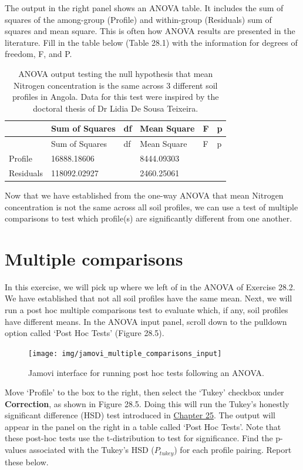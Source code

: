 \documentclass[
]{scrbook}
\begin{document}
The output in the right panel shows an ANOVA table.
It includes the sum of squares of the among-group (Profile) and within-group (Residuals) sum of squares and mean square.
This is often how ANOVA results are presented in the literature.
Fill in the table below (Table 28.1) with the information for degrees of freedom, F, and P.

\begin{longtable}[]{@{}llllll@{}}
\caption{\label{tab:unnamed-chunk-130}ANOVA output testing the null hypothesis that mean Nitrogen concentration is the same across 3 different soil profiles in Angola. Data for this test were inspired by the doctoral thesis of Dr Lidia De Sousa Teixeira.}\tabularnewline
\toprule
& Sum of Squares & df & Mean Square & F & p \\
\midrule
\endfirsthead
\toprule
& Sum of Squares & df & Mean Square & F & p \\
\midrule
\endhead
Profile & 16888.18606 & & 8444.09303 & & \\
Residuals & 118092.02927 & & 2460.25061 & & \\
\bottomrule
\end{longtable}

Now that we have established from the one-way ANOVA that mean Nitrogen concentration is not the same across all soil profiles, we can use a test of multiple comparisons to test which profile(s) are significantly different from one another.

\hypertarget{multiple-comparisons}{%
\section{Multiple comparisons}\label{multiple-comparisons}}

In this exercise, we will pick up where we left of in the ANOVA of Exercise 28.2.
We have established that not all soil profiles have the same mean.
Next, we will run a post hoc multiple comparisons test to evaluate which, if any, soil profiles have different means.
In the ANOVA input panel, scroll down to the pulldown option called `Post Hoc Tests' (Figure 28.5).

\begin{figure}
\texttt{[image: img/jamovi\_multiple\_comparisons\_input]} \caption{Jamovi interface for running post hoc tests following an ANOVA.}\label{fig:unnamed-chunk-131}
\end{figure}

Move `Profile' to the box to the right, then select the `Tukey' checkbox under \textbf{Correction}, as shown in Figure 28.5.
Doing this will run the Tukey's honestly significant difference (HSD) test introduced in \protect\hyperlink{Chapter_25}{Chapter 25}.
The output will appear in the panel on the right in a table called `Post Hoc Tests'.
Note that these post-hoc tests use the t-distribution to test for significance.
Find the p-values associated with the Tukey's HSD (\(P_{tukey}\)) for each profile pairing.
Report these below.
\end{document}
